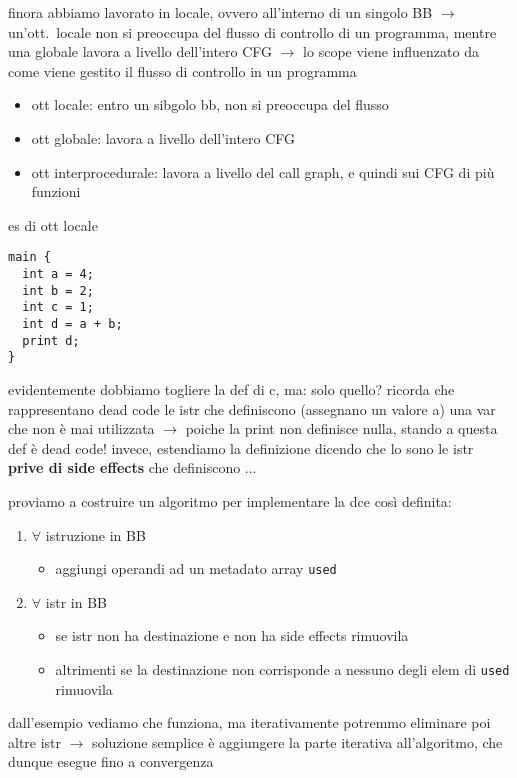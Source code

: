 finora abbiamo lavorato in locale, ovvero all'interno di un singolo BB $\rightarrow$ un'ott.~locale non si preoccupa del flusso di controllo di un programma, mentre una globale lavora a livello dell'intero CFG $\rightarrow$ lo scope viene influenzato da come viene gestito il flusso di controllo in un programma

\begin{itemize}
  \item ott locale: entro un sibgolo bb, non si preoccupa del flusso
  \item ott globale: lavora a livello dell'intero CFG
  \item ott interprocedurale: lavora a livello del call graph, e quindi sui CFG di pi\`u funzioni
\end{itemize}

\begin{example}[frametitle={dead code elimination}]
  es di ott locale
  \begin{lstlisting}
main {
  int a = 4;
  int b = 2;
  int c = 1;
  int d = a + b;
  print d;
}\end{lstlisting}
 evidentemente dobbiamo togliere la def di c, ma: solo quello? ricorda che rappresentano dead code le istr che definiscono (assegnano un valore a) una var che non \`e mai utilizzata $\rightarrow$ poiche la print non definisce nulla, stando a questa def \`e dead code! invece, estendiamo la definizione dicendo che lo sono le istr \textbf{prive di side effects} che definiscono ... 


  proviamo a costruire un algoritmo per implementare la dce cos\`i definita:
  \begin{enumerate}
    \item $\forall$ istruzione in BB
    \begin{itemize}
      \item aggiungi operandi ad un metadato array \lstinline|used|
    \end{itemize}
    \item $\forall$ istr in BB
    \begin{itemize}
      \item se istr non ha destinazione e non ha side effects rimuovila
      \item altrimenti se la destinazione non corrisponde a nessuno degli elem di \lstinline|used| rimuovila
    \end{itemize} 
  \end{enumerate}

  dall'esempio vediamo che funziona, ma iterativamente potremmo eliminare poi altre istr $\rightarrow$ soluzione semplice \`e aggiungere la parte iterativa all'algoritmo, che dunque esegue fino a convergenza
  
\end{example}

